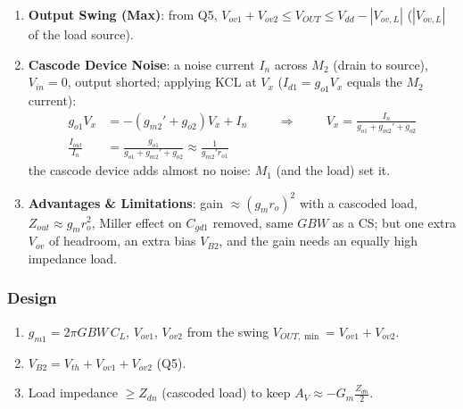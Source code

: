 \begin{enumerate}
    \paragraph{At Input:} \(I_G = 0\): \(Z_{in} \to \infty\) at DC, \(C_{gs1} + 2 C_{gd1}\) (Miller, above).
    \paragraph{At Output:} \(Z_{out} = Z_{dn} \parallel R_L \approx g_{m2} r_{o2} r_{o1} \parallel R_L\).
  \item \textbf{Output Swing (Max)}: from Q5, \(V_{ov1} + V_{ov2} \leq V_{OUT} \leq V_{dd} - |V_{ov,L}|\)
    (\(|V_{ov,L}|\) of the load source).
  \item \textbf{Cascode Device Noise}: a noise current \(I_n\) across \(M_2\) (drain to source), \(V_{in} = 0\), output shorted;
    applying KCL at \(V_x\) (\(I_{d1} = g_{o1}V_x\) equals the \(M_2\) current):
    \begin{align*}
      g_{o1}V_x &= -(g_{m2}' + g_{o2})V_x + I_n \hspace{1cm} \Rightarrow \hspace{1cm} V_x = \frac{I_n}{g_{o1} + g_{m2}' + g_{o2}} \\
      \frac{I_{out}}{I_n} &= \frac{g_{o1}}{g_{o1} + g_{m2}' + g_{o2}} \approx \frac{1}{g_{m2}' r_{o1}}
    \end{align*}
    the cascode device adds almost no noise: \(M_1\) (and the load) set it.
  \item \textbf{Advantages \& Limitations}: gain \(\approx (g_m r_o)^2\) with a cascoded load,
    \(Z_{out} \approx g_m r_o^2\), Miller effect on \(C_{gd1}\) removed, same \(GBW\) as a CS; but one
    extra \(V_{ov}\) of headroom, an extra bias \(V_{B2}\), and the gain needs an equally high
    impedance load.
\end{enumerate}

\subsubsection{Design}
\begin{enumerate}
  \item \(g_{m1} = 2\pi GBW\, C_L\), \(V_{ov1}\), \(V_{ov2}\) from the swing \(V_{OUT,\min} = V_{ov1} + V_{ov2}\).
  \item \(V_{B2} = V_{th} + V_{ov1} + V_{ov2}\) (Q5).
  \item Load impedance \(\geq Z_{dn}\) (cascoded load) to keep \(A_V \approx -G_m \frac{Z_{dn}}{2}\).
\end{enumerate}

